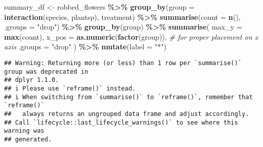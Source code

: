 \documentclass[
]{article}
\newenvironment{Shaded}{\begin{snugshade}}{\end{snugshade}}
\newcommand{\AttributeTok}[1]{\textcolor[rgb]{0.13,0.29,0.53}{#1}}
\newcommand{\CommentTok}[1]{\textcolor[rgb]{0.56,0.35,0.01}{\textit{#1}}}
\newcommand{\FunctionTok}[1]{\textcolor[rgb]{0.13,0.29,0.53}{\textbf{#1}}}
\newcommand{\NormalTok}[1]{#1}
\newcommand{\OtherTok}[1]{\textcolor[rgb]{0.56,0.35,0.01}{#1}}
\newcommand{\SpecialCharTok}[1]{\textcolor[rgb]{0.81,0.36,0.00}{\textbf{#1}}}
\newcommand{\StringTok}[1]{\textcolor[rgb]{0.31,0.60,0.02}{#1}}
\begin{document}
\begin{Shaded}
\begin{Highlighting}[]
\NormalTok{summary\_df }\OtherTok{\textless{}{-}}\NormalTok{ robbed\_flowers }\SpecialCharTok{\%\textgreater{}\%}
  \FunctionTok{group\_by}\NormalTok{(}\AttributeTok{group =} \FunctionTok{interaction}\NormalTok{(species, plantsp), treatment) }\SpecialCharTok{\%\textgreater{}\%}
  \FunctionTok{summarise}\NormalTok{(}\AttributeTok{count =} \FunctionTok{n}\NormalTok{(), }\AttributeTok{.groups =} \StringTok{"drop"}\NormalTok{) }\SpecialCharTok{\%\textgreater{}\%}
  \FunctionTok{group\_by}\NormalTok{(group) }\SpecialCharTok{\%\textgreater{}\%}
  \FunctionTok{summarise}\NormalTok{(}
    \AttributeTok{max\_y =} \FunctionTok{max}\NormalTok{(count),}
    \AttributeTok{x\_pos =} \FunctionTok{as.numeric}\NormalTok{(}\FunctionTok{factor}\NormalTok{(group)),  }\CommentTok{\# for proper placement on x axis}
    \AttributeTok{.groups =} \StringTok{"drop"}
\NormalTok{  ) }\SpecialCharTok{\%\textgreater{}\%}
  \FunctionTok{mutate}\NormalTok{(}\AttributeTok{label =} \StringTok{"*"}\NormalTok{)}
\end{Highlighting}
\end{Shaded}

\begin{verbatim}
## Warning: Returning more (or less) than 1 row per `summarise()` group was deprecated in
## dplyr 1.1.0.
## i Please use `reframe()` instead.
## i When switching from `summarise()` to `reframe()`, remember that `reframe()`
##   always returns an ungrouped data frame and adjust accordingly.
## Call `lifecycle::last_lifecycle_warnings()` to see where this warning was
## generated.
\end{verbatim}
\end{document}
